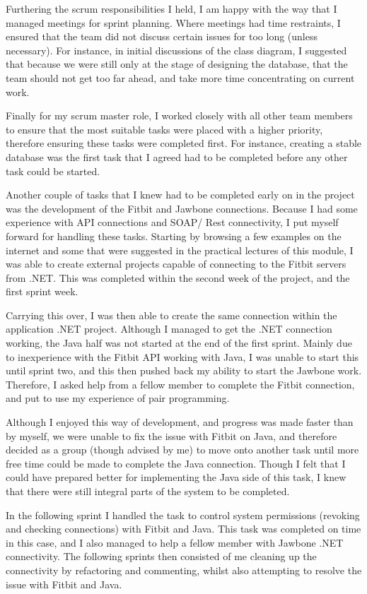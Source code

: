 Furthering the scrum responsibilities I held, I am happy with the way that I managed meetings for sprint planning. Where meetings had time restraints, I ensured that the team did not discuss certain issues for too long (unless necessary). For instance, in initial discussions of the class diagram, I suggested that because we were still only at the stage of designing the database, that the team should not get too far ahead, and take more time concentrating on current work. \par
Finally for my scrum master role, I worked closely with all other team members to ensure that the most suitable tasks were placed with a higher priority, therefore ensuring these tasks were completed first. For instance, creating a stable database was the first task that I agreed had to be completed before any other task could be started. \par
Another couple of tasks that I knew had to be completed early on in the project was the development of the Fitbit and Jawbone connections. Because I had some experience with API connections and SOAP/ Rest connectivity, I put myself forward for handling these tasks. Starting by browsing a few examples on the internet and some that were suggested in the practical lectures of this module, I was able to create external projects capable of connecting to the Fitbit servers from .NET. This was completed within the second week of the project, and the first sprint week. \par
Carrying this over, I was then able to create the same connection within the application .NET project. Although I managed to get the .NET connection working, the Java half was not started at the end of the first sprint. Mainly due to inexperience with the Fitbit API working with Java, I was unable to start this until sprint two, and this then pushed back my ability to start the Jawbone work. Therefore, I asked help from a fellow member to complete the Fitbit connection, and put to use my experience of pair programming. \par
Although I enjoyed this way of development, and progress was made faster than by myself, we were unable to fix the issue with Fitbit on Java, and therefore decided as a group (though advised by me) to move onto another task until more free time could be made to complete the Java connection. Though I felt that I could have prepared better for implementing the Java side of this task, I knew that there were still integral parts of the system to be completed. \par
In the following sprint I handled the task to control system permissions (revoking and checking connections) with Fitbit and Java. This task was completed on time in this case, and I also managed to help a fellow member with Jawbone .NET connectivity. The following sprints then consisted of me cleaning up the connectivity by refactoring and commenting, whilst also attempting to resolve the issue with Fitbit and Java. \par
